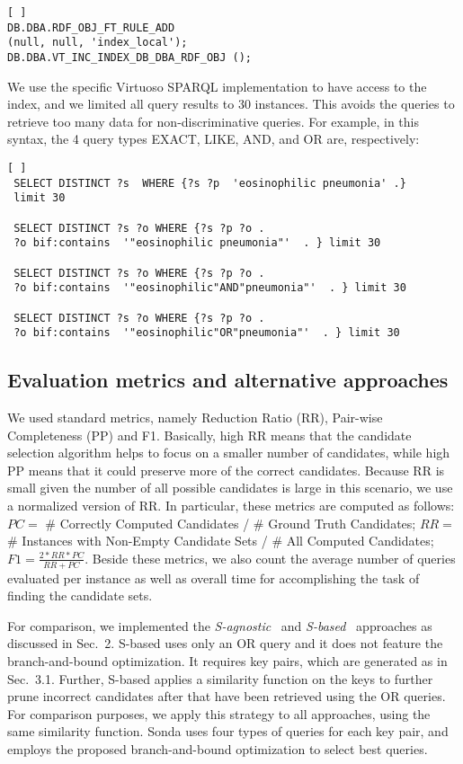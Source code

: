 \lstset{basicstyle=\small}
\begin{lstlisting}[ ]   
DB.DBA.RDF_OBJ_FT_RULE_ADD 
(null, null, 'index_local');
DB.DBA.VT_INC_INDEX_DB_DBA_RDF_OBJ (); 
\end{lstlisting}

We use the specific Virtuoso SPARQL implementation to have access to the index, and we limited all query results to 30 instances. This avoids the queries to retrieve too many data for non-discriminative queries. For example, in this syntax, the 4 query types EXACT, LIKE, AND, and OR are, respectively: 
\lstset{basicstyle=\small}
\begin{lstlisting}[ ]   
 SELECT DISTINCT ?s  WHERE {?s ?p  'eosinophilic pneumonia' .} 
 limit 30
 
 SELECT DISTINCT ?s ?o WHERE {?s ?p ?o .
 ?o bif:contains  '"eosinophilic pneumonia"'  . } limit 30
 
 SELECT DISTINCT ?s ?o WHERE {?s ?p ?o .
 ?o bif:contains  '"eosinophilic"AND"pneumonia"'  . } limit 30
 
 SELECT DISTINCT ?s ?o WHERE {?s ?p ?o .
 ?o bif:contains  '"eosinophilic"OR"pneumonia"'  . } limit 30
\end{lstlisting}

\subsection{Evaluation metrics and alternative approaches} 
We used standard metrics, namely Reduction Ratio (RR), Pair-wise Completeness (PP) and F1. Basically, high RR means that the candidate selection algorithm helps to focus on a smaller number of candidates, while high PP means that it could preserve more of the correct candidates. Because RR is small given the number of all possible candidates is large in this scenario, we use a normalized version of RR. In particular, these metrics are computed as follows: $PC =$ \# Correctly Computed Candidates / \# Ground Truth Candidates; $RR =$ \# Instances with Non-Empty Candidate Sets / \# All Computed Candidates; $F1 = \frac{2 * RR * PC}{ RR + PC}$. Beside these metrics, we also count the average number of queries evaluated per instance as well as overall time for accomplishing the task of finding the candidate sets. 


For comparison, we implemented the \emph{S-agnostic}~\cite{papadakis_efficient_2011} and \emph{S-based}~\cite{DBLP:conf/semweb/SongH11} approaches as discussed in Sec.~2. S-based uses only an OR query and it does not feature the branch-and-bound optimization. It requires key pairs, which are generated as in Sec.~3.1. Further, S-based applies a similarity function on the keys to further prune incorrect candidates after that have been retrieved using the OR queries. For comparison purposes, we apply this strategy to all approaches, using the same similarity function. Sonda uses four types of queries for each key pair, and employs the proposed branch-and-bound optimization to select best queries. 

